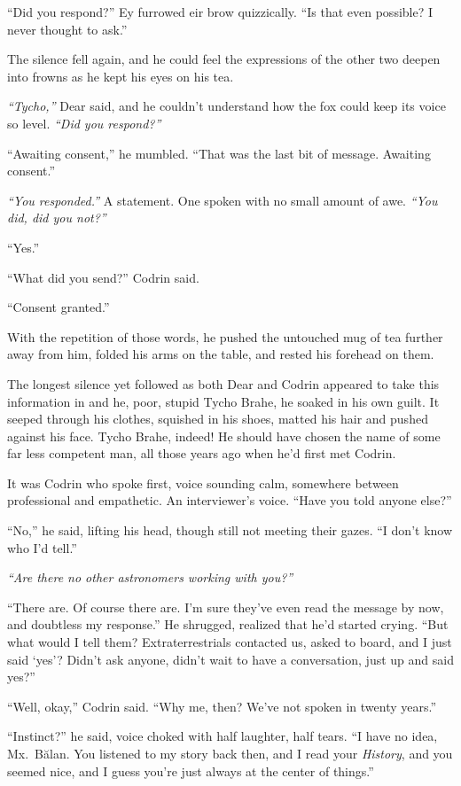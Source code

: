 ``Did you respond?'' Ey furrowed eir brow quizzically. ``Is that even possible? I never thought to ask.''

The silence fell again, and he could feel the expressions of the other two deepen into frowns as he kept his eyes on his tea.

\emph{``Tycho,''} Dear said, and he couldn't understand how the fox could keep its voice so level. \emph{``Did you respond?''}

``Awaiting consent,'' he mumbled. ``That was the last bit of message. Awaiting consent.''

\emph{``You responded.''} A statement. One spoken with no small amount of awe. \emph{``You did, did you not?''}

``Yes.''

``What did you send?'' Codrin said.

``Consent granted.''

With the repetition of those words, he pushed the untouched mug of tea further away from him, folded his arms on the table, and rested his forehead on them.

The longest silence yet followed as both Dear and Codrin appeared to take this information in and he, poor, stupid Tycho Brahe, he soaked in his own guilt. It seeped through his clothes, squished in his shoes, matted his hair and pushed against his face. Tycho Brahe, indeed! He should have chosen the name of some far less competent man, all those years ago when he'd first met Codrin.

It was Codrin who spoke first, voice sounding calm, somewhere between professional and empathetic. An interviewer's voice. ``Have you told anyone else?''

``No,'' he said, lifting his head, though still not meeting their gazes. ``I don't know who I'd tell.''

\emph{``Are there no other astronomers working with you?''}

``There are. Of course there are. I'm sure they've even read the message by now, and doubtless my response.'' He shrugged, realized that he'd started crying. ``But what would I tell them? Extraterrestrials contacted us, asked to board, and I just said `yes'? Didn't ask anyone, didn't wait to have a conversation, just up and said yes?''

``Well, okay,'' Codrin said. ``Why me, then? We've not spoken in twenty years.''

``Instinct?'' he said, voice choked with half laughter, half tears. ``I have no idea, Mx.~Bălan. You listened to my story back then, and I read your \emph{History}, and you seemed nice, and I guess you're just always at the center of things.''


